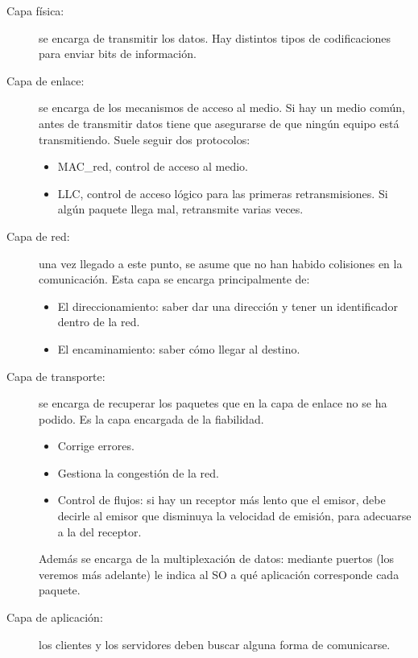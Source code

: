 \begin{description}
    \item [Capa física:] se encarga de transmitir los datos. Hay distintos tipos de codificaciones para enviar bits de información.
    \item [Capa de enlace:] se encarga de los mecanismos de acceso al medio. Si hay un medio común, antes de transmitir datos tiene que asegurarse de que ningún equipo está transmitiendo. Suele seguir dos protocolos: 
        \begin{itemize}
            \item \acrfull{MAC_red}, control de acceso al medio.
            \item \acrfull{LLC}, control de acceso lógico para las primeras retransmisiones. Si algún paquete llega mal, retransmite varias veces. 
        \end{itemize}
    
    \item [Capa de red:] una vez llegado a este punto, se asume que no han habido colisiones en la comunicación. Esta capa se encarga principalmente de: 
        \begin{itemize}
            \item El direccionamiento: saber dar una dirección y tener un identificador dentro de la red. 
            \item El encaminamiento: saber cómo llegar al destino. 
        \end{itemize}

    \item [Capa de transporte:] se encarga de recuperar los paquetes que en la capa de enlace no se ha podido. Es la capa encargada de la fiabilidad. 
        \begin{itemize}
            \item Corrige errores.
            \item Gestiona la congestión de la red.
            \item Control de flujos: si hay un receptor más lento que el emisor, debe decirle al emisor que disminuya la velocidad de emisión, para adecuarse a la del receptor. 
        \end{itemize}
    Además se encarga de la multiplexación de datos: mediante puertos (los veremos más adelante) le indica al SO a qué aplicación corresponde cada paquete. 
    \item [Capa de aplicación:] los clientes y los servidores deben buscar alguna forma de comunicarse. 
\end{description}

